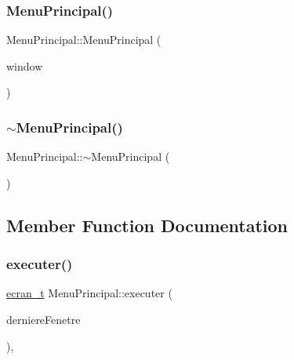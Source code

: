 \subsubsection{\texorpdfstring{Menu\+Principal()}{MenuPrincipal()}}
{\footnotesize\ttfamily Menu\+Principal\+::\+Menu\+Principal (\begin{DoxyParamCaption}\item[{sf\+::\+Render\+Window \&}]{window }\end{DoxyParamCaption})}

\mbox{\label{class_menu_principal_a5f451a872334cfa96b59f47dbae52adc}} 
\subsubsection{\texorpdfstring{$\sim$\+Menu\+Principal()}{~MenuPrincipal()}}
{\footnotesize\ttfamily Menu\+Principal\+::$\sim$\+Menu\+Principal (\begin{DoxyParamCaption}{ }\end{DoxyParamCaption})\hspace{0.3cm}{\ttfamily [inline]}}



\subsection{Member Function Documentation}
\mbox{\label{class_menu_principal_aed108ac830821b93ae4a03673ec566b9}} 
\subsubsection{\texorpdfstring{executer()}{executer()}}
{\footnotesize\ttfamily \mbox{\hyperlink{constantes_8h_a33e4f15dde10f34860a6b35be343ae56}{ecran\+\_\+t}} Menu\+Principal\+::executer (\begin{DoxyParamCaption}\item[{sf\+::\+Texture \&}]{derniere\+Fenetre }\end{DoxyParamCaption})\hspace{0.3cm}{\ttfamily [override]}, {\ttfamily [virtual]}}



